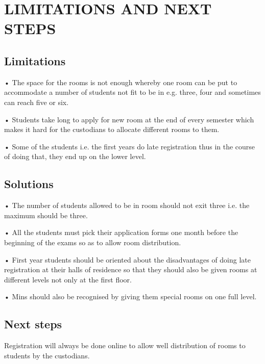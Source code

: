 \documentclass[14pt]{article}
\begin{document}
\section{LIMITATIONS AND NEXT STEPS}

\subsection{Limitations}
•	The space for the rooms is not enough whereby one room can be put to accommodate a number of students not fit to be in e.g. three, four and sometimes can reach five or six.\par
	
•	Students take long to apply for new room at the end of every semester which makes it hard for the custodians to allocate different rooms to them.\par

•	Some of the students i.e. the first years do late registration thus in the course of doing that, they end up on the lower level.\par



\subsection{Solutions}
•	The number of students allowed to be in room should not exit three i.e. the maximum should be three.\par

•	All the students must pick their application forms one month before the beginning of the exams so as to allow room distribution.\par

•	First year students should be oriented about the disadvantages of doing late registration at their halls of residence so that they should also be given rooms at different levels not only at the first floor.\par

•	Mins should also be recognised by giving them special rooms on one full level.\par


\subsection{Next steps}

Registration will always be done online to allow well distribution of rooms to students by  the custodians.\par
\end{document}
